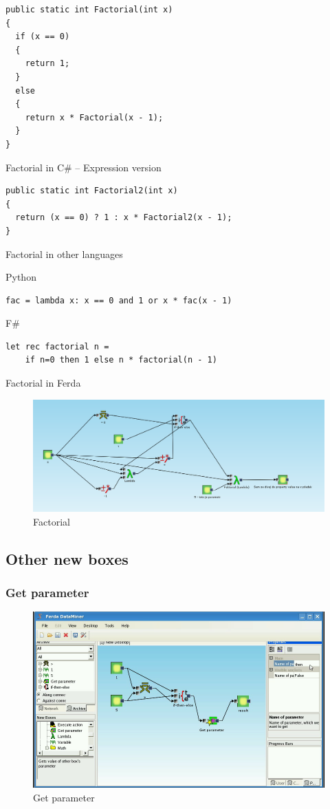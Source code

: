 \documentclass[a4paper,12pt]{book}
\begin{document}
\begin{verbatim}
public static int Factorial(int x)
{
  if (x == 0)
  {
    return 1;
  }
  else
  {
    return x * Factorial(x - 1);
  }
}
\end{verbatim}
	
Factorial in C\# -- Expression version

\begin{verbatim}
public static int Factorial2(int x)
{
  return (x == 0) ? 1 : x * Factorial2(x - 1);
}
\end{verbatim}

Factorial in other languages

Python
\begin{verbatim}
fac = lambda x: x == 0 and 1 or x * fac(x - 1)
\end{verbatim}

F\#
\begin{verbatim}
let rec factorial n =
    if n=0 then 1 else n * factorial(n - 1)
\end{verbatim}
	
Factorial in Ferda
\begin{figure}
\includegraphics[width=12cm]{faktorial}
	\caption{Factorial}
\end{figure}

\subsection{Other new boxes}
\subsubsection{Get parameter}
\begin{figure}
\includegraphics[width=12cm]{getParameter2.png}
	\caption{Get parameter}
\end{figure}
\end{document}
